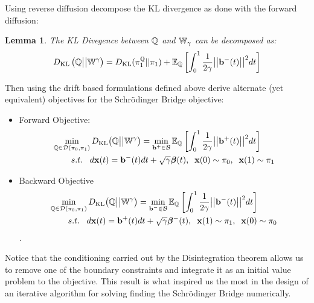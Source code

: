\documentclass[a4paper,12pt,twoside,openright]{report}
\newtheorem{lemma}[theorem]{Lemma}
\theoremstyle{definition}
\begin{document}
Using reverse diffusion \cite{pavon1991free} decompose the KL divergence as done with the forward diffusion:
\begin{lemma}\label{lemma:control}\citep{pavon1991free}
    The KL Divegence between ${\mathbb{Q}}$ and $\mathbb{W}_{\gamma}$ can be decomposed as:
\begin{align}\label{eq:free_energy_2}
     D_{\mathrm{KL}}\left({\mathbb{Q}} \big|\big| \mathbb{W}^{\gamma}\right) = D_{\mathrm{KL}}(\pi^{{\mathbb{Q}}}_1 || \pi_1) + \mathbb{E}_{\mathbb{Q}}\left[\int_0^1\frac{1}{2\gamma} \big|\big|{\mathbf{b}}^{-}(t)\big|\big|^2 dt\right]
\end{align}
\end{lemma}
Then using the drift based formulations defined above \cite{pavon1991free} derive alternate (yet equivalent) objectives for the Schrödinger Bridge objective:

\begin{itemize}
\item Forward Objective: 
\begin{align} \label{eq:controlled_bridge_forward}
    \min_{{\mathbb{Q}} \in {\mathcal{D}}(\pi_0, \pi_1)} D_{\mathrm{KL}}\big({\mathbb{Q}} \big|\big| \mathbb{W}^{\gamma}\big)& = \min_{{\mathbf{b}}^{+} \in {\mathcal{B}} }  \mathbb{E}_{\mathbb{Q}}\left[\int_0^1 \frac{1}{2\gamma}\big|\big|{\mathbf{b}}^{+}(t) \big|\big|^2 dt\right] \nonumber \\
    s.t.\;\;\; d{\mathbf{x}}(t) = {\mathbf{b}}^{-}(t) &dt + \sqrt{\gamma} {\bm{\beta}}(t), \;\; {\mathbf{x}}(0) \sim \pi_0, \;\; {\mathbf{x}}(1) \sim \pi_1
\end{align}
\item Backward Objective
\begin{align} \label{eq:controlled_bridge_backward}
    \min_{{\mathbb{Q}} \in {\mathcal{D}}(\pi_0, \pi_1)} D_{\mathrm{KL}}\big({\mathbb{Q}} \big|\big| \mathbb{W}^{\gamma}\big)& = \min_{{\mathbf{b}}^{-} \in {\mathcal{B}} }  \mathbb{E}_{\mathbb{Q}}\left[\int_0^1 \frac{1}{2\gamma}\big|\big|{\mathbf{b}}^{-}(t) \big|\big|^2 dt\right] \nonumber \\
    s.t.\;\;\; d{\mathbf{x}}(t) = {\mathbf{b}}^{+}(t) &dt + \sqrt{\gamma} {\bm{\beta}}^{-}(t), \;\; {\mathbf{x}}(1) \sim \pi_1 , \;\; {\mathbf{x}}(0) \sim \pi_0
\end{align}.
\end{itemize}
Notice that the conditioning carried out by the Disintegration theorem allows us to remove one of the boundary constraints and integrate it as an initial value problem to the objective. This result is what inspired us the most in the design of an iterative algorithm for solving finding the Schrödinger Bridge numerically. 
\end{document}
